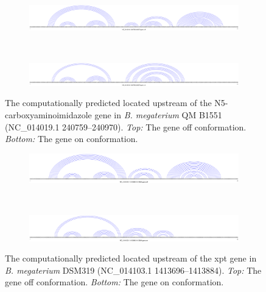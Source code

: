 \begin{figure}[!ht]
\centering
\begin{subfigure}[h]{\textwidth}
\centering
\includegraphics[width=.9\textwidth]{Figures/Ribofinder/NC_014019_1_240759_240970_OFF.pdf}
\end{subfigure} \\
\medskip
\begin{subfigure}[h]{\textwidth}
\centering
\includegraphics[width=.9\textwidth]{Figures/Ribofinder/NC_014019_1_240759_240970_ON.pdf}
\end{subfigure}
\caption{The computationally predicted \rb located upstream of the
N5-carboxyaminoimidazole
gene in {\em B. megaterium} QM B1551 (NC\_014019.1 240759--240970).
{\em Top:} The gene off conformation. {\em Bottom:} The gene on conformation.}
\label{fig:figure:NC_014019_1_240759_240970}
\end{figure}
\medskip

\begin{figure}[!ht]
\centering
\begin{subfigure}[h]{\textwidth}
\centering
\includegraphics[width=.9\textwidth]{Figures/Ribofinder/NC_014103_1_1413696_1413884_OFF.pdf}
\end{subfigure} \\
\medskip
\begin{subfigure}[h]{\textwidth}
\centering
\includegraphics[width=.9\textwidth]{Figures/Ribofinder/NC_014103_1_1413696_1413884_ON.pdf}
\end{subfigure}
\caption{The computationally predicted \rb located upstream of the xpt
gene in {\em B. megaterium} DSM319 (NC\_014103.1 1413696--1413884).
{\em Top:} The gene off conformation. {\em Bottom:} The gene on conformation.}
\label{fig:figure:NC_014103_1_1413696_1413884}
\end{figure}
\medskip

